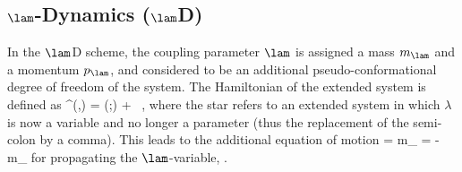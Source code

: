 \subsection{$\lam$-Dynamics ($\lam$D)}


In the $\lam$D scheme\cite{KO96.1,DA01.7,GU03.1,KN09.1,KN11.2,DO11.2,AR15.2,HA17.1}, 
the coupling parameter $\lam$ is assigned a mass
$m_\lam$ and a momentum $p_\lam$, and considered to be an additional
pseudo-conformational degree of freedom of the system.
%
The Hamiltonian of the extended system is defined as
%
  \ham^\star(\xv,\lam) = \ham(\xv;\lam) +  \ ,
\eeq
%
where the star refers to an extended system in which $\lambda$ 
is now a variable and no longer a parameter 
(thus the replacement of the semi-colon by a comma).
%
This leads to the additional equation of motion
%
  \ddot{\lam} =  {m_{\lam}} 
              = - {m_{\lam}} 
                 \frac {\partial\ham(\xv;\lam)} {\partial\lam}
\eeq
%
for propagating the $\lam$-variable, .
%


